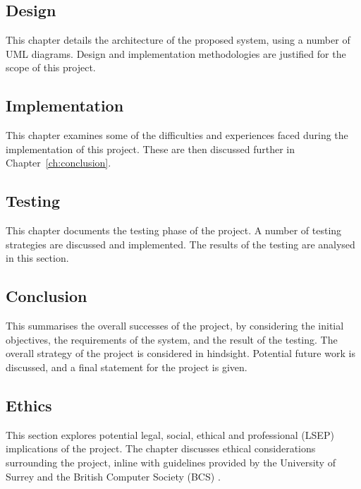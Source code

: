 \subsection*{Design}
This chapter details the architecture of the proposed system, using a number of UML diagrams. Design and implementation methodologies are justified for the scope of this project.

\subsection*{Implementation}
This chapter examines some of the difficulties and experiences faced during the implementation of this project. These are then discussed further in Chapter~\ref{ch:conclusion}.

\subsection*{Testing}
This chapter documents the testing phase of the project. A number of testing strategies are discussed and implemented. The results of the testing are analysed in this section.

\subsection*{Conclusion}
This summarises the overall successes of the project, by considering the initial objectives, the requirements of the system, and the result of the testing. The overall strategy of the project is considered in hindsight. Potential future work is discussed, and a final statement for the project is given.

\subsection*{Ethics}
This section explores potential legal, social, ethical and professional (LSEP) implications of the project. The chapter discusses ethical considerations surrounding the project, inline with guidelines provided by the University of Surrey \cite{surreyethics} and the British Computer Society (BCS) \cite{bcs2019conduct}.

